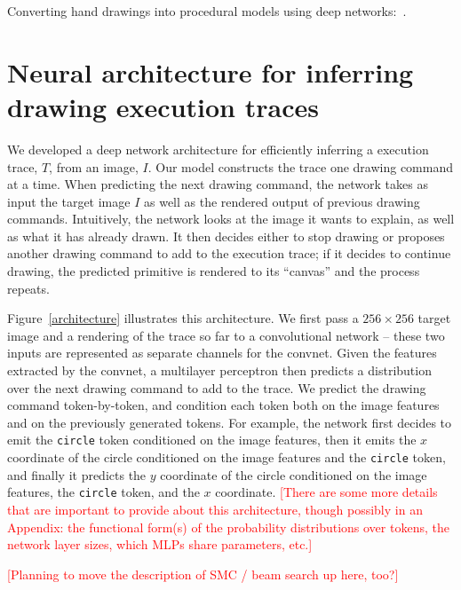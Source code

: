 \documentclass{article}
\newcommand{\remark}[1]{\textcolor{red}{[#1]}}
\begin{document}
Converting hand drawings into procedural models using deep networks:~\cite{huang2017shape,Nishida:2016:ISU:2897824.2925951}.



\section{Neural architecture for inferring drawing execution traces}

We developed a deep network architecture for efficiently inferring a
execution trace, $T$, from an image, $I$.  Our model constructs the
trace one drawing command at a time.  When predicting the next drawing
command, the network takes as input the target image $I$ as well as
the rendered output of previous drawing commands.  Intuitively, the
network looks at the image it wants to explain, as well as what it has
already drawn.  It then decides either to stop drawing or proposes
another drawing command to add to the execution trace; if it decides
to continue drawing, the predicted primitive is rendered to its
``canvas'' and the process repeats.

Figure~\ref{architecture} illustrates this architecture.  We first
pass a $256\times 256$ target image and a rendering of the trace so
far to a convolutional network -- these two inputs are represented as
separate channels for the convnet. Given the features extracted by the
convnet, a multilayer perceptron then predicts a distribution over the
next drawing command to add to the trace.  We predict the drawing
command token-by-token, and condition each token both on the image
features and on the previously generated tokens.  For example, the
network first decides to emit the \verb|circle| token conditioned on
the image features, then it emits the $x$ coordinate of the circle
conditioned on the image features and the \verb|circle| token, and
finally it predicts the $y$ coordinate of the circle conditioned on
the image features, the \verb|circle| token, and the $x$ coordinate.
\remark{There are some more details that are important to provide
  about this architecture, though possibly in an Appendix: the
  functional form(s) of the probability distributions over tokens, the
  network layer sizes, which MLPs share parameters, etc.}

\remark{Planning to move the description of SMC / beam search up here, too?}
\end{document}
